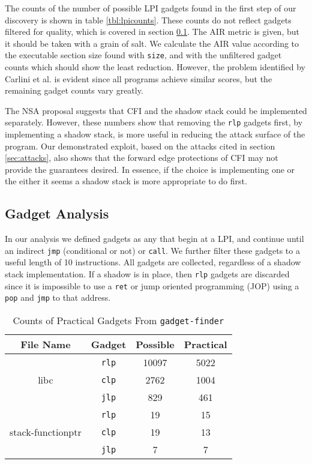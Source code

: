 \documentclass[conference,compsoc]{IEEEtran}
\begin{document}
The counts of the number of possible LPI gadgets found in the first step of our discovery is shown in table \ref{tbl:lpicounts}. These counts do not reflect gadgets filtered for quality, which is covered in section \ref{sec:ganalysis}. The AIR metric is given, but it should be taken with a grain of salt\cite{carlini}. We calculate the AIR value according to the executable section size found with \texttt{size}, and with the unfiltered gadget counts which should show the least reduction. However, the problem identified by Carlini et al. is evident since all programs achieve similar scores, but the remaining gadget counts vary greatly.

The NSA proposal suggests that CFI and the shadow stack could be implemented separately. However, these numbers show that removing the \texttt{rlp} gadgets first, by implementing a shadow stack, is more useful in reducing the attack surface of the program. Our demonstrated exploit, based on the attacks cited in section \ref{sec:attacks}\cite{carlini,evans,conti}, also shows that the forward edge protections of CFI may not provide the guarantees desired. In essence, if the choice is implementing one or the either it seems a shadow stack is more appropriate to do first.


\subsection{Gadget Analysis} \label{sec:ganalysis}

In our analysis we defined gadgets as any that begin at a LPI, and continue until an indirect \texttt{jmp} (conditional or not) or \texttt{call}. We further filter these gadgets to a useful length of 10 instructions\cite{carlini2014rop}. All gadgets are collected, regardless of a shadow stack implementation. If a shadow is in place, then \texttt{rlp} gadgets are discarded since it is impossible to use a \texttt{ret} or jump oriented programming (JOP) using a \texttt{pop} and \texttt{jmp} to that address\cite{bletsch2011jump}.

\begin{table}[H]
\renewcommand{\arraystretch}{1.3}
\centering
\caption{Counts of Practical Gadgets From \texttt{gadget-finder}}
\label{tbl:gadgetcounts}
\begin{tabular}{|c|c|c|c|}
\hline
File Name & Gadget & Possible & Practical\\
\hline
\multirow{3}{4em}{libc} & \texttt{rlp} & 10097 & 5022\\
& \texttt{clp} & 2762 & 1004\\
& \texttt{jlp} & 829 & 461\\
\hline
\multirow{3}{4em}{stack-functionptr} & \texttt{rlp} & 19 & 15\\
& \texttt{clp} & 19 & 13\\
& \texttt{jlp} & 7 & 7\\
\hline
\end{tabular}
\end{table}
\end{document}
